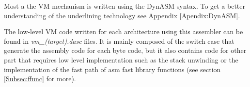 Most a the VM mechanism is written using the DynASM syntax. To get a better
understanding of the underlining technology see Appendix \ref{Apendix:DynASM}.

The low-level VM code written for each architecture using this assembler can be
found in \emph{vm\_(target).dasc} files. It is mainly composed of the switch
case that generate the assembly code for each byte code, but it also contains
code for other part that requires low level implementation such as the
stack unwinding or the implementation of the fast path of asm fast library functions
(see section \ref{Subsec:ffunc} for more).
